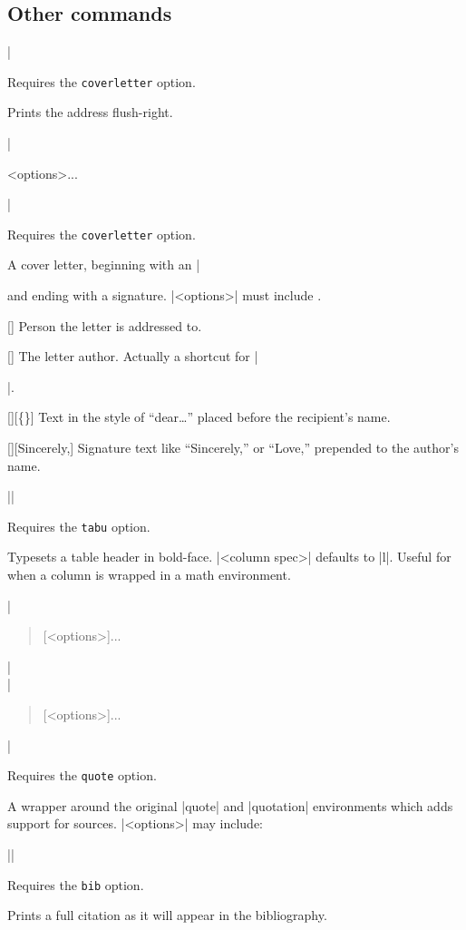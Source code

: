 \documentclass{ltxguidex}
\newcommand{\reqopt}[1]{Requires the \texttt{\color{magenta}#1} option.\par}
\begin{document}
\subsection{Other commands}

\begin{desc}
|\address|
\end{desc}
\reqopt{coverletter} Prints the address flush-right.

\begin{desc}
|\begin{coverletter}{<options>}...\end{coverletter}|
\end{desc}
\reqopt{coverletter} A cover letter, beginning with an |\address| and ending
with a signature. |<options>| must include .
\begin{keys}
	[]
	Person the letter is addressed to.

	[]
	The letter author. Actually a shortcut for |\author{<author>}|.

	[][\{\}]
	Text in the style of ``dear\dots'' placed before the recipient's
	name.

	[][Sincerely,]
	Signature text like ``Sincerely,'' or ``Love,'' prepended to the
	author's name.
\end{keys}

\begin{desc}
||
\end{desc}

\reqopt{tabu} Typesets a table header in bold-face. |<column spec>| defaults
to |l|. Useful for when a column is wrapped in a math environment.

\begin{desc}
|\begin{quote}[<options>]...\end{quote}|\\
|\begin{quotation}[<options>]...\end{quotation}|\\
\end{desc}

\reqopt{quote} A wrapper around the original |quote| and |quotation|
environments which adds support for sources. |<options>| may include:

\begin{desc}
||
\end{desc}

\reqopt{bib} Prints a full citation as it will appear in the bibliography.
\end{document}
